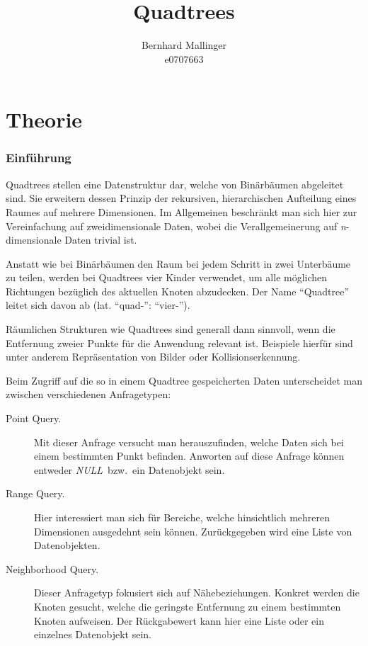 \documentclass[%
			paper=a4,%
			DIV12, %
			draft=false,%
			titlepage
			]{scrartcl}
\title{Quadtrees}
\author{Bernhard Mallinger \\ e0707663}
\newcommand{\mynull}{\textit{NULL}}
\begin{document}
\maketitle

\tableofcontents 

\newpage

\part{Theorie}
\section{Einführung}
Quadtrees stellen eine Datenstruktur dar, welche von Binärbäumen abgeleitet sind. Sie erweitern dessen Prinzip der rekursiven, hierarchischen Aufteilung eines Raumes auf mehrere Dimensionen. 
Im Allgemeinen beschränkt man sich hier zur Vereinfachung auf zweidimensionale Daten, wobei die Verallgemeinerung auf \textit{n}-dimensionale Daten trivial ist.

Anstatt wie bei Binärbäumen den Raum bei jedem Schritt in zwei Unterbäume zu teilen, werden bei Quadtrees vier Kinder verwendet, um alle möglichen Richtungen bezüglich des aktuellen Knoten abzudecken. Der Name "`Quadtree"' leitet sich davon ab (lat. "`quad-"': "`vier-"').

Räumlichen Strukturen wie Quadtrees sind generall dann sinnvoll, wenn die Entfernung zweier Punkte für die Anwendung relevant ist. Beispiele hierfür sind unter anderem Repräsentation von Bilder oder Kollisionserkennung.

Beim Zugriff auf die so in einem Quadtree gespeicherten Daten unterscheidet man zwischen verschiedenen Anfragetypen:
\begin{description}
	\item[Point Query.] Mit dieser Anfrage versucht man herauszufinden, welche Daten sich bei einem bestimmten Punkt befinden. Anworten auf diese Anfrage können entweder \mynull\ bzw.\ ein Datenobjekt sein.
	\item[Range Query.] Hier interessiert man sich für Bereiche, welche hinsichtlich mehreren Dimensionen ausgedehnt sein können. Zurückgegeben wird eine Liste von Datenobjekten.
	\item[Neighborhood Query.] Dieser Anfragetyp fokusiert sich auf Nähebeziehungen. Konkret werden die Knoten gesucht, welche die geringste Entfernung zu einem bestimmten Knoten aufweisen. Der Rückgabewert kann hier eine Liste oder ein einzelnes Datenobjekt sein.
\end{description}
\end{document}
